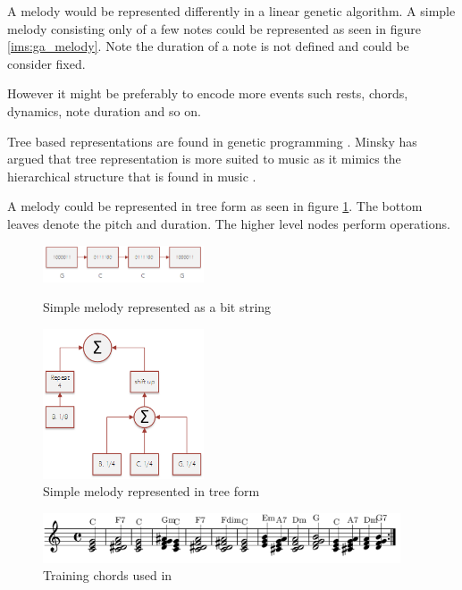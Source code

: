 A melody would be represented differently in a linear genetic algorithm.
A simple melody consisting only of a few notes could be represented as seen in figure \ref{ims:ga_melody}. Note the duration of a note is not defined and could be consider fixed.

However it might be preferably to encode more events such rests, chords, dynamics, note duration and so on.

Tree based representations are found in genetic programming \cite{Langdon2008}. Minsky has argued that tree representation is more suited to music as it mimics the hierarchical structure that is found in music \cite{Minsky1992}.

A melody could be represented in tree form as seen in figure \ref{ims:gp_melody}. The bottom leaves denote the pitch and duration. The higher level nodes perform operations.


\begin{figure}
\centering
\begin{minipage}{.5\textwidth}
  \centering
  \includegraphics[width=180px]{../images/ga_melody.png}
  \caption{Simple melody represented as a bit string}
\label{ims:ga_melody}
\end{minipage}%
\begin{minipage}{.5\textwidth}
  \centering
  \includegraphics[width=180px]{../images/gp_melody.png}
  \caption{Simple melody represented in tree form}
\label{ims:gp_melody}
\end{minipage}
\end{figure}

\begin{figure}
\centerline{\includegraphics[width=400px]{../images/eck_chords_training.png}}
\caption{Training chords used in \cite{Eck2002}}
\label{ims:eckchords}
\end{figure}

